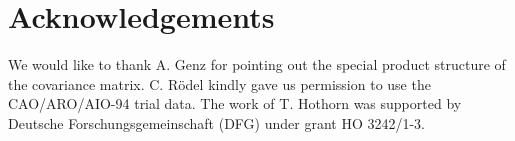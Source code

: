 \section*{Acknowledgements}

We would like to thank A. Genz for pointing out the special
product structure of the covariance matrix. C. R\"odel
kindly gave us permission to use the CAO/ARO/AIO-94 trial data.
The work of T. Hothorn was supported by Deutsche Forschungsgemeinschaft (DFG) 
under grant HO 3242/1-3.
